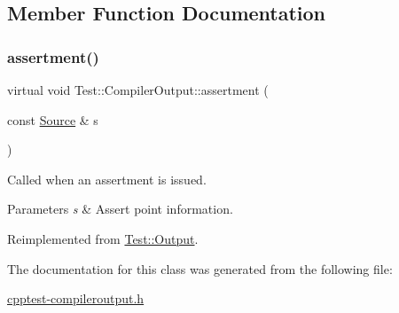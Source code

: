 \subsection{Member Function Documentation}
\mbox{\label{class_test_1_1_compiler_output_a1c36e3fd12afe3556e887349b0b86b50}} 
\subsubsection{\texorpdfstring{assertment()}{assertment()}}
{\footnotesize\ttfamily virtual void Test\+::\+Compiler\+Output\+::assertment (\begin{DoxyParamCaption}\item[{const \mbox{\hyperlink{class_test_1_1_source}{Source}} \&}]{s }\end{DoxyParamCaption})\hspace{0.3cm}{\ttfamily [virtual]}}

Called when an assertment is issued.


\begin{DoxyParams}{Parameters}
{\em s} & Assert point information. \\
\hline
\end{DoxyParams}


Reimplemented from \mbox{\hyperlink{class_test_1_1_output_a48c31f0baa7627d81939be840c9a7f65}{Test\+::\+Output}}.



The documentation for this class was generated from the following file\+:\begin{DoxyCompactItemize}
\item 
\mbox{\hyperlink{cpptest-compileroutput_8h}{cpptest-\/compileroutput.\+h}}\end{DoxyCompactItemize}
